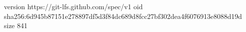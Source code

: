 version https://git-lfs.github.com/spec/v1
oid sha256:6d945b87151e278897df5d3f84dc689d8fcc27bf302dea4f6076913e8088d19d
size 841
